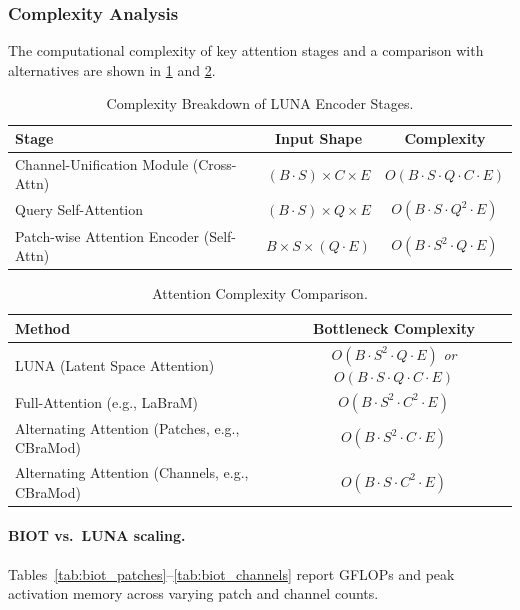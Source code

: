 \subsubsection{Complexity Analysis}
\label{app:biot_scaling}
The computational complexity of key attention stages and a comparison with alternatives are shown in \ref{tab:app_complexity_breakdown} and 
\ref{tab:app_attention_complexity}.

\begin{table}[htbp!]
\centering
\caption{Complexity Breakdown of LUNA Encoder Stages.}
\label{tab:app_complexity_breakdown}
\begin{tabular}{@{}lcc@{}}
\toprule
\textbf{Stage} & \textbf{Input Shape} & \textbf{Complexity} \\
\midrule
Channel-Unification Module (Cross-Attn) & $(B \cdot S) \times C \times E$ & $O(B \cdot S \cdot Q \cdot C \cdot E)$ \\
Query Self-Attention & $(B \cdot S) \times Q \times E$ & $O(B \cdot S \cdot Q^2 \cdot E)$ \\
Patch-wise Attention Encoder (Self-Attn) & $B \times S \times (Q\cdot E)$ & $O(B \cdot S^2 \cdot Q \cdot E)$ \\ 
\bottomrule
\end{tabular}
\end{table}

\begin{table}[htbp!]
\centering
\caption{Attention Complexity Comparison.}
\label{tab:app_attention_complexity}
\begin{tabular}{@{}lc@{}}
\toprule
\textbf{Method} & \textbf{Bottleneck Complexity} \\ 
\midrule
LUNA (Latent Space Attention) & $O(B \cdot S^2 \cdot Q \cdot E)$ \textit{or} $O(B \cdot S \cdot Q \cdot C \cdot E)$ \\
Full-Attention (e.g., LaBraM) & $O(B \cdot S^2 \cdot C^2 \cdot E)$ \\
Alternating Attention (Patches, e.g., CBraMod) & $O(B \cdot S^2 \cdot C \cdot E)$ \\
Alternating Attention (Channels, e.g., CBraMod) & $O(B \cdot S \cdot C^2 \cdot E)$ \\
\bottomrule
\end{tabular}
\end{table}


\paragraph{BIOT vs.\ LUNA scaling.}
Tables~\ref{tab:biot_patches}--\ref{tab:biot_channels} report GFLOPs and peak activation memory across varying patch and channel counts.

